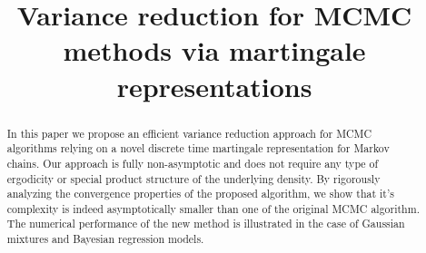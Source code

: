 \documentclass[bj]{imsart}
\begin{document}
\begin{frontmatter}
\title{Variance reduction for MCMC methods via martingale representations}



\begin{abstract}
In this paper we propose an efficient variance reduction approach for  MCMC algorithms relying on a novel discrete time martingale representation for Markov chains. Our approach is fully non-asymptotic and does not require any type of ergodicity or special product structure of the underlying density.  By rigorously analyzing the  convergence properties of the proposed algorithm, we show that it's complexity is indeed asymptotically smaller than one of the original MCMC algorithm. The numerical performance of the new method is illustrated  in the case of Gaussian mixtures and Bayesian regression models.
\end{abstract}

\begin{keyword}[class=MSC]
\end{keyword}

\begin{keyword}
\end{keyword}

\end{frontmatter}
\end{document}
